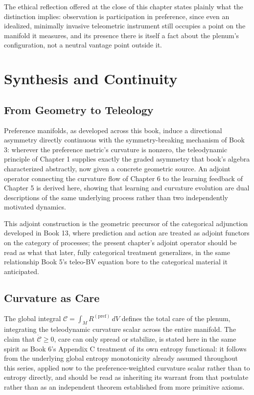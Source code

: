 The ethical reflection offered at the close of this chapter states plainly what the distinction implies: observation is participation in preference, since even an idealized, minimally invasive teleometric instrument still occupies a point on the manifold it measures, and its presence there is itself a fact about the plenum's configuration, not a neutral vantage point outside it.

\part{Synthesis and Continuity}

\chapter{From Geometry to Teleology}

Preference manifolds, as developed across this book, induce a directional asymmetry directly continuous with the symmetry-breaking mechanism of Book 3: wherever the preference metric's curvature is nonzero, the teleodynamic principle of Chapter 1 supplies exactly the graded asymmetry that book's algebra characterized abstractly, now given a concrete geometric source. An adjoint operator connecting the curvature flow of Chapter 6 to the learning feedback of Chapter 5 is derived here, showing that learning and curvature evolution are dual descriptions of the same underlying process rather than two independently motivated dynamics.

This adjoint construction is the geometric precursor of the categorical adjunction developed in Book 13, where prediction and action are treated as adjoint functors on the category of processes; the present chapter's adjoint operator should be read as what that later, fully categorical treatment generalizes, in the same relationship Book 5's teleo-BV equation bore to the categorical material it anticipated.

\chapter{Curvature as Care}

The global integral $\mathcal{C} = \int_M R^{(\text{pref})} \, dV$ defines the total care of the plenum, integrating the teleodynamic curvature scalar across the entire manifold. The claim that $\dot{\mathcal{C}} \geq 0$, care can only spread or stabilize, is stated here in the same spirit as Book 6's Appendix C treatment of its own entropy functional: it follows from the underlying global entropy monotonicity already assumed throughout this series, applied now to the preference-weighted curvature scalar rather than to entropy directly, and should be read as inheriting its warrant from that postulate rather than as an independent theorem established from more primitive axioms.

